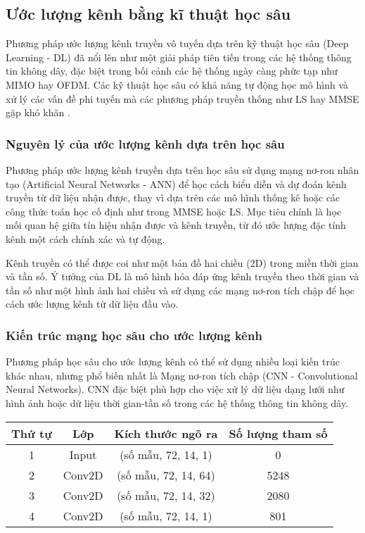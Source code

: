 \subsection{Ước lượng kênh bằng kĩ thuật học sâu}

Phương pháp ước lượng kênh truyền vô tuyến dựa trên kỹ thuật học sâu (Deep Learning - DL) đã nổi lên như một giải pháp tiên tiến trong các hệ thống thông tin không dây, 
đặc biệt trong bối cảnh các hệ thống ngày càng phức tạp như MIMO hay OFDM. 
Các kỹ thuật học sâu có khả năng tự động học mô hình và xử lý các vấn đề phi tuyến mà các phương pháp truyền thống như LS hay MMSE gặp khó khăn \cite{Soltani2019}. 

\subsubsection{Nguyên lý của ước lượng kênh dựa trên học sâu}

Phương pháp ước lượng kênh truyền dựa trên học sâu sử dụng mạng nơ-ron nhân tạo (Artificial Neural Networks - ANN) để học cách biểu diễn và dự đoán kênh truyền từ dữ liệu nhận được, 
thay vì dựa trên các mô hình thống kê hoặc các công thức toán học cố định như trong MMSE hoặc LS. 
Mục tiêu chính là học mối quan hệ giữa tín hiệu nhận được và kênh truyền, từ đó ước lượng đặc tính kênh một cách chính xác và tự động.

Kênh truyền có thể được coi như một bản đồ hai chiều (2D) trong miền thời gian và tần số. 
Ý tưởng của DL là mô hình hóa đáp ứng kênh truyền theo thời gian và tần số như một hình ảnh hai chiều và sử dụng các mạng nơ-ron tích chập để học cách ước lượng kênh từ dữ liệu đầu vào.

\subsubsection{Kiến trúc mạng học sâu cho ước lượng kênh}

Phương pháp học sâu cho ước lượng kênh có thể sử dụng nhiều loại kiến trúc khác nhau, nhưng phổ biến nhất là Mạng nơ-ron tích chập (CNN - Convolutional Neural Networks). 
CNN đặc biệt phù hợp cho việc xử lý dữ liệu dạng lưới như hình ảnh hoặc dữ liệu thời gian-tần số trong các hệ thống thông tin không dây.

\begin{table}[H]
    \centering
    \begin{tabular}{cccc}
        \hline
        \textbf{Thứ tự} & \textbf{Lớp} & \textbf{Kích thước ngõ ra} & \textbf{Số lượng tham số} \\
        \hline
        1 & Input & (số mẫu, 72, 14, 1) & 0 \\
        2 & Conv2D & (số mẫu, 72, 14, 64) & 5248 \\
        3 & Conv2D & (số mẫu, 72, 14, 32) & 2080 \\
        4 & Conv2D & (số mẫu, 72, 14, 1) & 801
    \end{tabular}
\end{table}

